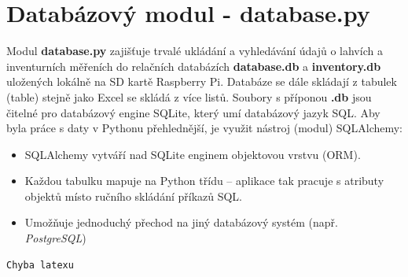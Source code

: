 %
%        


\section{Databázový modul - database.py}

Modul \textbf{database.py} zajišťuje trvalé ukládání a vyhledávání údajů o lahvích a inventurních měřeních do relačních databázích \textbf{database.db} a \textbf{inventory.db} uložených lokálně na SD kartě Raspberry Pi. Databáze se dále skládají z tabulek (table) stejně jako Excel se skládá z více listů. Soubory s příponou \textbf{.db} jsou čitelné pro databázový engine SQLite, který umí databázový jazyk SQL. Aby byla práce s daty v Pythonu přehlednější, je využit nástroj (modul) SQLAlchemy:
\begin{itemize}
    \item SQLAlchemy vytváří nad SQLite enginem objektovou vrstvu (ORM).
    \item Každou tabulku mapuje na Python třídu – aplikace tak pracuje s atributy objektů místo ručního skládání příkazů SQL.
    \item Umožňuje jednoduchý přechod na jiný databázový systém (např. \textit{PostgreSQL})
\end{itemize}

\begin{lstlisting}[language=Python,breaklines=false, frame=single, caption=Ukázka třídy database.db a inventory.db]
Chyba latexu
\end{lstlisting}

